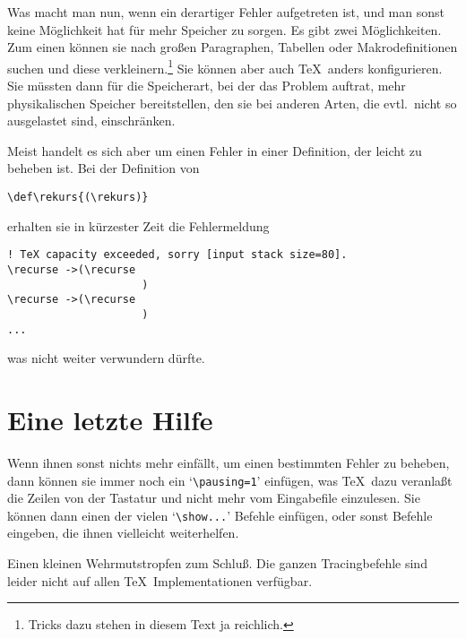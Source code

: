 Was macht man nun, wenn ein derartiger Fehler aufgetreten ist, und man
sonst keine M\"oglichkeit hat f\"ur mehr Speicher zu sorgen. Es gibt zwei
M\"oglichkeiten. Zum einen k\"onnen sie nach gro\ss{}en Paragraphen,
Tabellen
oder Makrodefinitionen suchen und diese verkleinern.\footnote{Tricks
dazu stehen in diesem Text ja reichlich.} Sie k\"onnen aber auch \TeX\
anders konfigurieren. Sie m\"ussten dann f\"ur die Speicherart, bei der
das Problem auftrat, mehr physikalischen Speicher bereitstellen, den
sie bei anderen Arten, die evtl.\ nicht so ausgelastet sind,
einschr\"anken.

Meist handelt es sich aber um einen Fehler in einer Definition, der
leicht zu beheben ist. Bei der Definition von
\begin{verbatim}
\def\rekurs{(\rekurs)}
\end{verbatim}
erhalten sie in k\"urzester Zeit die Fehlermeldung
\begin{verbatim}
! TeX capacity exceeded, sorry [input stack size=80].
\recurse ->(\recurse
                     )
\recurse ->(\recurse
                     )
...
\end{verbatim}
was nicht weiter verwundern d\"urfte.
\section{Eine letzte Hilfe}
Wenn ihnen sonst nichts mehr einf\"allt, um einen bestimmten Fehler zu
beheben, dann k\"onnen sie immer noch ein
`\verb|\pausing=1|' einf\"ugen,
was \TeX\ dazu veranla\ss{}t die Zeilen von der Tastatur und nicht mehr
vom \index{Eingabe!Vom File}Eingabefile einzulesen. Sie k\"onnen dann einen der vielen
`\verb|\show...|' Befehle einf\"ugen, oder sonst Befehle eingeben, die
ihnen vielleicht weiterhelfen.

Einen kleinen Wehrmutstropfen zum Schlu\ss{}. Die ganzen Tracingbefehle
sind leider nicht auf allen \TeX\ Implementationen verf\"ugbar.

